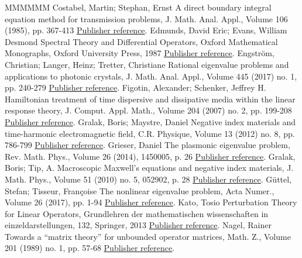 \begin{thebibliography}{MMMMMM}
 Costabel, Martin; Stephan, Ernst A direct boundary integral equation method for transmission problems, J. Math. Anal. Appl., Volume 106 (1985), pp. 367-413 \href{https://ahl.centre-mersenne.org/item/AHL_2020__3__1161_0/#Cos-Ste-85}{Publisher reference}.
 Edmunds, David Eric; Evans, William Desmond Spectral Theory and Differential Operators, Oxford Mathematical Monographs, Oxford University Press, 1987 \href{https://ahl.centre-mersenne.org/item/AHL_2020__3__1161_0/#Edm-Eva-87}{Publisher reference}.
 Engström, Christian; Langer, Heinz; Tretter, Christiane Rational eigenvalue problems and applications to photonic crystals, J. Math. Anal. Appl., Volume 445 (2017) no. 1, pp. 240-279 \href{https://ahl.centre-mersenne.org/item/AHL_2020__3__1161_0/#Eng-Lan-Tre-17}{Publisher reference}.
 Figotin, Alexander; Schenker, Jeffrey H. Hamiltonian treatment of time dispersive and dissipative media within the linear response theory, J. Comput. Appl. Math., Volume 204 (2007) no. 2, pp. 199-208 \href{https://ahl.centre-mersenne.org/item/AHL_2020__3__1161_0/#Fig-Sch-07}{Publisher reference}.
 Gralak, Boris; Maystre, Daniel Negative index materials and time-harmonic electromagnetic field, C.R. Physique, Volume 13 (2012) no. 8, pp. 786-799 \href{https://ahl.centre-mersenne.org/item/AHL_2020__3__1161_0/#Gra-May-12}{Publisher reference}.
 Grieser, Daniel The plasmonic eigenvalue problem, Rev. Math. Phys., Volume 26 (2014), 1450005, p. 26 \href{https://ahl.centre-mersenne.org/item/AHL_2020__3__1161_0/#Gri-14}{Publisher reference}.
 Gralak, Boris; Tip, A. Macroscopic Maxwell’s equations and negative index materials, J. Math. Phys., Volume 51 (2010) no. 5, 052902, p. 28 \href{https://ahl.centre-mersenne.org/item/AHL_2020__3__1161_0/#Gra-Tip-10}{Publisher reference}.
 Güttel, Stefan; Tisseur, Françoise The nonlinear eigenvalue problem, Acta Numer., Volume 26 (2017), pp. 1-94 \href{https://ahl.centre-mersenne.org/item/AHL_2020__3__1161_0/#Gut-Tis-17}{Publisher reference}.
 Kato, Tosio Perturbation Theory for Linear Operators, Grundlehren der mathematischen wissenschaften in einzeldarstellungen, 132, Springer, 2013 \href{https://ahl.centre-mersenne.org/item/AHL_2020__3__1161_0/#Kato-84}{Publisher reference}.
 Nagel, Rainer Towards a “matrix theory” for unbounded operator matrices, Math. Z., Volume 201 (1989) no. 1, pp. 57-68 \href{https://ahl.centre-mersenne.org/item/AHL_2020__3__1161_0/#Nag-89}{Publisher reference}.

\end{thebibliography}
